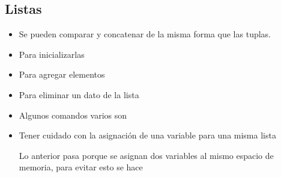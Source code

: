 \subsection*{Listas}

\begin{itemize}
    \item Se pueden comparar y concatenar de la misma forma que las tuplas.
    \item Para inicializarlas

    \item Para agregar elementos
 
    \item Para eliminar un dato de la lista

    \item Algunos comandos varios son 

    \item Tener cuidado con la asignación de una variable para una misma lista

    Lo anterior pasa porque se asignan dos variables al mismo espacio de memoria, para evitar esto se hace

\end{itemize}
